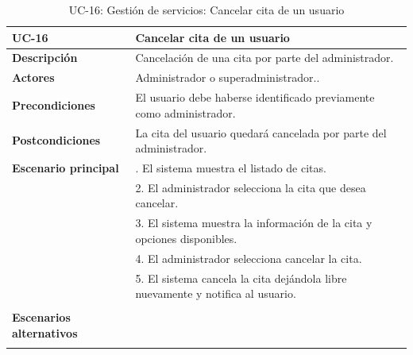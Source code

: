 \begin{table}
  \begin{center}
    \begin{tabularx}{16.4cm}{|l|X|}
      \hline
      \textbf{UC-16} & \textbf{Cancelar cita de un usuario}\\
      \hline
      \textbf{Descripción} & Cancelación de una cita por parte del administrador. \\
      \hline
      \textbf{Actores} & Administrador o superadministrador..\\
      \hline
      \textbf{Precondiciones} & El usuario debe haberse identificado previamente como administrador.\\
      \hline
      \textbf{Postcondiciones} & La cita del usuario quedará cancelada por parte del administrador.\\
      \hline
      \textbf{Escenario principal} & \smallskip 1. El sistema muestra el listado de citas.\\
      & 2. El administrador selecciona la cita que desea cancelar.\\
      & 3. El sistema muestra la información de la cita y opciones disponibles.\\
      & 4. El administrador selecciona cancelar la cita.\\
      & 5. El sistema cancela la cita dejándola libre nuevamente y notifica al usuario.\\
      & \\
      \hline
      \textbf{Escenarios alternativos} & \\
      & \\
      \hline
    \end{tabularx}
    \caption{UC-16: Gestión de servicios: Cancelar cita de un usuario}
    \label{tab:CU-cancelar-cita-admin}
  \end{center}
\end{table}


